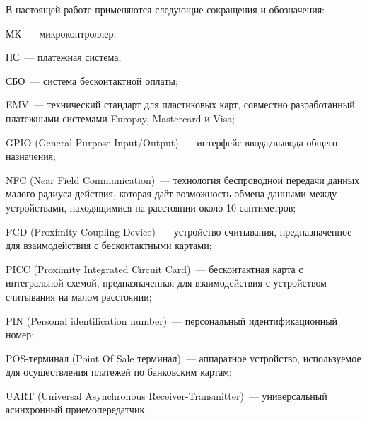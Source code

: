 \newpage


В настоящей работе применяются следующие сокращения и обозначения:

\begin{description}

	\item МК~--- микроконтроллер;
	\item ПС~--- платежная система;
	\item СБО~--- система бесконтактной оплаты;

	\item EMV~--- технический стандарт для пластиковых карт, совместно разработанный платежными системами Europay, Mastercard и Visa;
	\item GPIO (General Purpose Input/Output)~--- интерфейс ввода/вывода общего назначения;
	\item NFC (Near Field Communication)~--- технология беспроводной передачи данных малого радиуса действия, которая даёт возможность обмена данными между устройствами, находящимися на расстоянии около 10 сантиметров;
	\item PCD (Proximity Coupling Device)~--- устройство считывания, предназначенное для взаимодействия с бесконтактными картами;
	\item PICC (Proximity Integrated Circuit Card)~--- бесконтактная карта с интегральной схемой, предназначенная для взаимодействия с устройством считывания на малом расстоянии;
	\item PIN (Personal identification number)~--- персональный идентификационный номер;
	\item POS-терминал (Point Of Sale терминал)~--- аппаратное устройство, используемое для осуществления платежей по банковским картам;
	\item UART (Universal Asynchronous Receiver-Transmitter)~--- универсальный асинхронный приемопередатчик.

\item \end{description}
